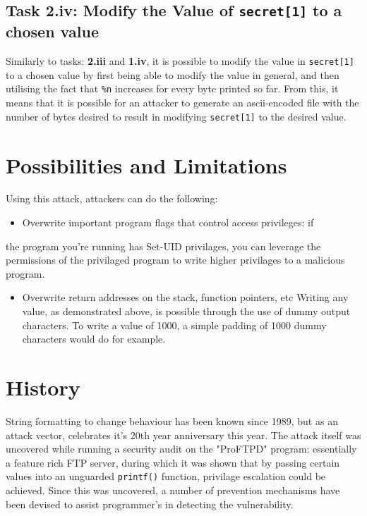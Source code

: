 \documentclass[11pt]{article}
\begin{document}
\subsection{Task 2.iv: Modify the Value of \texttt{secret[1]} to a chosen value}
\label{sec:org726fbf2}

Similarly to tasks: \textbf{2.iii} and \textbf{1.iv}, it is possible to modify the
value in \texttt{secret[1]} to a chosen value by first being able to modify
the value in general, and then utilising the fact that \texttt{\%n} increases
for every byte printed so far. From this, it means that it is possible
for an attacker to generate an ascii-encoded file with the number of
bytes desired to result in modifying \texttt{secret[1]} to the desired value.

\section{Possibilities and Limitations}
\label{sec:org0b97fc7}

Using this attack, attackers can do the following:

\begin{itemize}
\item Overwrite important program flags that control access privileges: if
\end{itemize}
the program  you're running has Set-UID privilages, you can leverage
the permissions  of the privilaged program to write higher privilages
to a malicious program.

\begin{itemize}
\item Overwrite return addresses on the stack, function pointers, etc
Writing any value, as demonstrated above, is possible through the
use of dummy output characters. To write a value of 1000, a simple
padding of 1000 dummy characters would do for example.
\end{itemize}

\section{History}
\label{sec:org6f9fb25}

String formatting to change behaviour has been known since 1989, but
as an attack vector, celebrates it's 20th year anniversary this
year. The attack itself was uncovered while running a security audit
on the "ProFTPD" program: essentially a feature rich FTP server,
during which it was shown that by passing certain values into an
unguarded \texttt{printf()} function, privilage escalation could be
achieved. Since this was uncovered, a number of prevention mechanisms
have been devised to assist programmer's in detecting the vulnerability.
\end{document}
